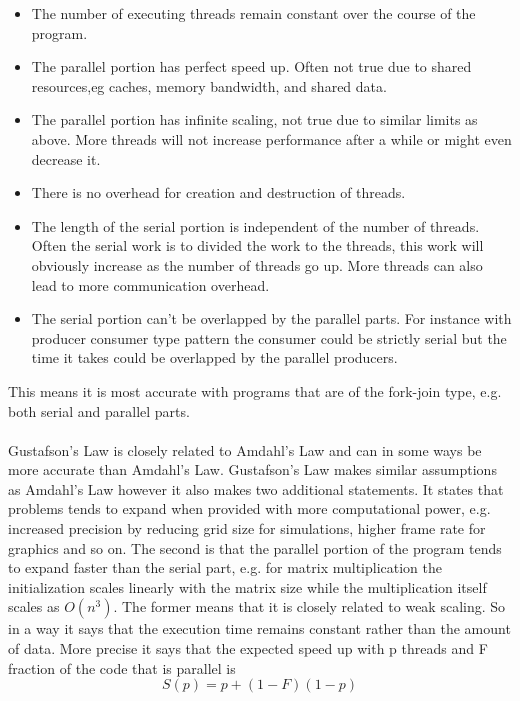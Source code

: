 \documentclass[10pt,a4paper]{report}
\begin{document}
\begin{itemize}
  \item The number of executing threads remain constant over the course of the program.
  \item The parallel portion has perfect speed up. Often not true due to shared resources,eg caches, memory bandwidth, and shared data.
  \item The parallel portion has infinite scaling, not true due to similar limits as above. More threads will not increase performance after a while or might even decrease it.
  \item There is no overhead for creation and destruction of threads.
  \item The length of the serial portion is independent of the number of threads. Often the serial work is to divided the work to the threads, this work will obviously increase as the number of threads go up. More threads can also lead to more communication overhead.
  \item The serial portion can't be overlapped by the parallel parts. For instance with producer consumer type pattern the consumer could be strictly serial but the time it takes could be overlapped by the parallel producers.
\end{itemize}

This means it is most accurate with programs that are of the fork-join type, e.g. both serial and parallel parts\cite{gustafson1988reevaluating}.\\
\\
Gustafson's Law is closely related to Amdahl's Law and can in some ways be more accurate than Amdahl's Law\cite{gustafson1988reevaluating}. Gustafson's Law makes similar assumptions as Amdahl's Law however it also makes two additional statements. It states that problems tends to expand when provided with more computational power, e.g. increased precision by reducing grid size for simulations, higher frame rate for graphics and so on\cite{gustafson1988reevaluating, introduction_hpc_hager}. The second is that the parallel portion of the program tends to expand faster than the serial part, e.g. for matrix multiplication the initialization scales linearly with the matrix size while the multiplication itself scales as $O(n^3)$\cite{gustafson1988reevaluating, introduction_hpc_hager}. The former means that it is closely related to weak scaling\cite{introduction_hpc_hager}. So in a way it says that the execution time remains constant rather than the amount of data. More precise it says that the expected speed up with p threads and F fraction of the code that is parallel is\cite{gustafson1988reevaluating, cuda_best_practice, introduction_hpc_hager}
$$S(p)=p+(1-F)(1-p)$$
\end{document}
